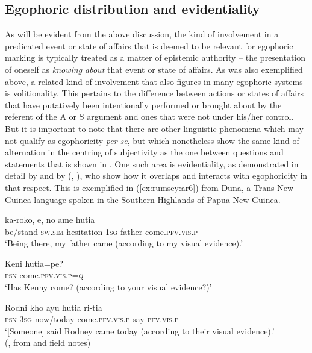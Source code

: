 \documentclass[output=paper]{langsci/langscibook}
\begin{document}
\subsection{Egophoric distribution and evidentiality}\label{s:ar2-1}

As will be evident from the above discussion, the kind of involvement in a predicated event or state of affairs that is deemed to be relevant for egophoric marking is typically treated as a matter of epistemic authority – the presentation of oneself as \textit{knowing about} that event or state of affairs. As was also exemplified above, a related kind of involvement that also figures in many egophoric systems is volitionality. This pertains to the difference between actions or states of affairs that have putatively been intentionally performed or brought about by the referent of the A or S argument and ones that were not under his/her control. But it is important to note that there are other linguistic phenomena which may not qualify as egophoricity \textit{per se}, but which nonetheless show the same kind of alternation in the centring of subjectivity as the one between questions and statements that is shown in . One such area is evidentiality, as demonstrated in detail by \cite{Aikhenvald2004} and by \citeauthor{SanRoque2015} (\citealt{SanRoque2015}, \citealt{SanRoqueSchieffelin2018}), who show how it overlaps and interacts with egophoricity in that respect.  This is exemplified in (\ref{ex:rumsey:ar6}) from Duna, a Trans-New Guinea language spoken in the Southern Highlands of Papua New Guinea.

\begin{exe}
	\ex \label{ex:rumsey:ar6}
	\begin{xlist}
		\ex \label{ex:rumsey:ar6a}
		\gll ka-roko, e, no ame hutia\\
		be/stand-\textsc{sw}.\textsc{sim} hesitation 1\textsc{sg} father come.\textsc{pfv}.\textsc{vis}.\textsc{p}\\
		\trans ‘Being there, my father came (according to my visual evidence).’

		\ex \label{ex:rumsey:ar6b}
		\gll Keni hutia=pe?\\
		\textsc{psn} come.\textsc{pfv}.\textsc{vis}.\textsc{p}=\textsc{q}\\
		\trans ‘Has Kenny come? (according to your visual evidence?)’
		
		\ex \label{ex:rumsey:ar6c}
		\gll Rodni kho ayu hutia ri-tia\\
		\textsc{psn} 3\textsc{sg} now/today come.\textsc{pfv}.\textsc{vis}.\textsc{p} say-\textsc{pfv}.\textsc{vis}.\textsc{p}\\
		\trans ‘[Someone] said Rodney came today (according to their visual evidence).’ \\(\citealt[56]{SanRoqueSchieffelin2018}, from \citealt{SanRoque2008} and field notes)
	\end{xlist}	
\end{exe}
\end{document}
